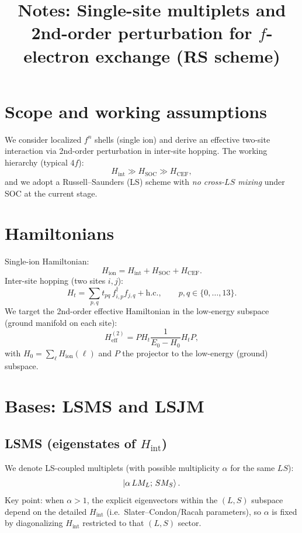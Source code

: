 \documentclass[11pt]{article}
\title{Notes: Single-site multiplets and 2nd-order perturbation for $f$-electron exchange (RS scheme)}
\author{}
\date{}
\begin{document}
\maketitle

\section{Scope and working assumptions}
We consider localized $f^n$ shells (single ion) and derive an effective two-site interaction via 2nd-order perturbation in inter-site hopping. The working hierarchy (typical $4f$):
\begin{equation}
H_{\text{int}} \gg H_{\text{SOC}} \gg H_{\text{CEF}},
\end{equation}
and we adopt a Russell--Saunders (LS) scheme with \emph{no cross-$LS$ mixing} under SOC at the current stage.

\section{Hamiltonians}
Single-ion Hamiltonian:
\begin{equation}
H_{\text{ion}} = H_{\text{int}} + H_{\text{SOC}} + H_{\text{CEF}}.
\end{equation}
Inter-site hopping (two sites $i,j$):
\begin{equation}
H_t=\sum_{p,q} t_{pq}\, f^\dagger_{i,p} f_{j,q} + \text{h.c.},
\qquad p,q\in\{0,\dots,13\}.
\end{equation}
We target the 2nd-order effective Hamiltonian in the low-energy subspace (ground manifold on each site):
\begin{equation}
H_{\text{eff}}^{(2)} = P H_t \frac{1}{E_0 - H_0} H_t P,
\end{equation}
with $H_0=\sum_\ell H_{\text{ion}}(\ell)$ and $P$ the projector to the low-energy (ground) subspace.

\section{Bases: LSMS and LSJM}
\subsection{LSMS (eigenstates of $H_{\text{int}}$)}
We denote LS-coupled multiplets (with possible multiplicity $\alpha$ for the same $LS$):
\begin{equation}
\ket{\alpha\,L M_L;\, S M_S}.
\end{equation}
Key point: when $\alpha>1$, the explicit eigenvectors within the $(L,S)$ subspace depend on the detailed $H_{\text{int}}$ (i.e.\ Slater--Condon/Racah parameters), so $\alpha$ is fixed by diagonalizing $H_{\text{int}}$ restricted to that $(L,S)$ sector.
\end{document}
